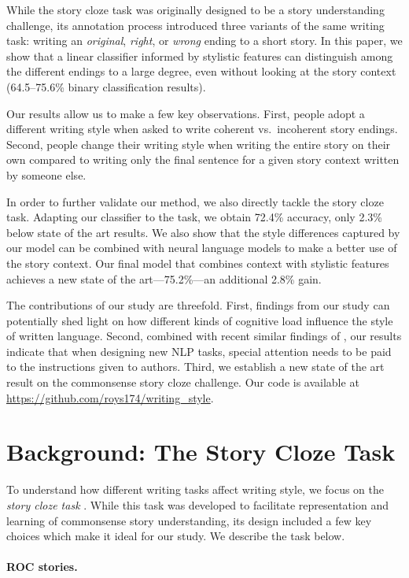\documentclass[11pt,a4paper]{article}
\newcommand{\isection}[2]{\section{#1}\label{ssec:#2}}
\begin{document}
While the story cloze task was originally designed to be a story understanding challenge, 
its annotation process introduced three variants of the same writing task: writing an {\it original}, {\it right}, or {\it wrong} ending to a short story.
In this paper, we show that a linear classifier informed by stylistic features can distinguish among the different endings to a large degree, even without looking at the story context (64.5--75.6\% binary classification results).

Our results allow us to make a few key observations.
First, people adopt a different writing style when asked to write coherent vs.~incoherent story endings.
Second,  people change their writing style when writing the entire story on their own compared to 
writing only the final sentence for a given story context written by someone else.


In order to further validate our method, we also directly tackle the
story cloze task. 
Adapting our classifier to the task, we obtain 72.4\% accuracy, only 2.3\% below state of the art results.
We also show that the style differences captured by our model can be combined with neural language models to make a better use of the story context. 
Our final model that combines context with stylistic features achieves
a new state of the art---75.2\%---an additional 2.8\% gain.

The contributions of our study are threefold. 
First, findings from our study can potentially shed light on 
how different kinds of cognitive load influence the style of written language. 
Second, combined with recent similar findings of \citet{Cai:2017}, our results indicate that when designing new NLP tasks, special attention needs to be paid to the instructions given to authors.
Third, we establish a new state of the art result on the commonsense story cloze challenge. 
Our code is available at \url{https://github.com/roys174/writing_style}.

\isection{Background: The Story Cloze Task}{ROC_Story}
To understand how different writing tasks affect writing style, 
we focus on the \textit{story cloze task} \cite{Mostafazadeh:2016}. 
While this task was developed to facilitate representation and learning of commonsense story understanding,
its design included a few key choices which  make it ideal for our study. 
We describe the task below.




\paragraph{ROC stories.}
\end{document}
